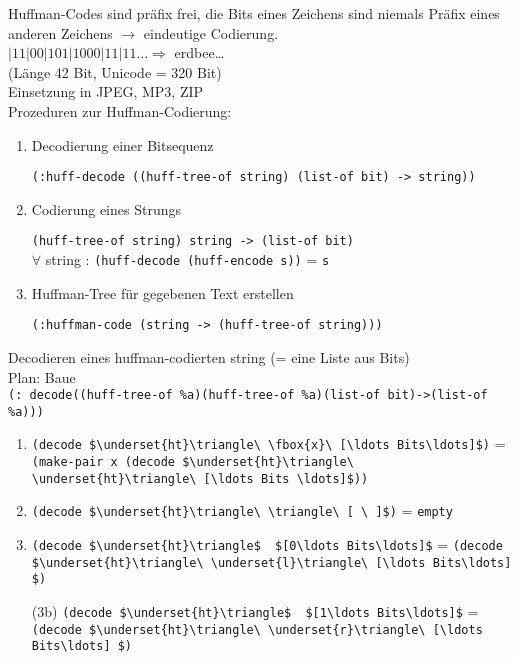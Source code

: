 Huffman-Codes sind präfix frei, die Bits eines Zeichens sind niemals Präfix eines anderen Zeichens $\rightarrow$ eindeutige Codierung.\\
$\vert11\vert00\vert101\vert1000\vert11\vert11\ldots \Rightarrow$ erdbee\ldots\\
(Länge 42 Bit, Unicode = 320 Bit)\\
Einsetzung in JPEG, MP3, ZIP\\
Prozeduren zur Huffman-Codierung:
\begin{enumerate}[(1)]
\item Decodierung einer Bitsequenz \par\lstinline|(:huff-decode ((huff-tree-of string) (list-of bit) -> string))|
\item Codierung eines Strungs\par\lstinline|(huff-tree-of string) string -> (list-of bit)|\\
$\forall$ string : \lstinline|(huff-decode (huff-encode s))| = \lstinline|s|
\item Huffman-Tree für gegebenen Text erstellen\par\lstinline|(:huffman-code (string -> (huff-tree-of string)))|
\end{enumerate}
Decodieren eines huffman-codierten string (= eine Liste aus Bits)\\
Plan: Baue \\\lstinline|(: decode((huff-tree-of %a)(huff-tree-of %a)(list-of bit)->(list-of %a)))|
\begin{enumerate}[(1)]
\item \lstinline[mathescape]|(decode $\underset{ht}\triangle\ \fbox{x}\ [\ldots Bits\ldots]$)| = \lstinline[mathescape]|(make-pair x (decode $\underset{ht}\triangle\ \underset{ht}\triangle\ [\ldots Bits \ldots]$))|
\item \lstinline[mathescape]|(decode $\underset{ht}\triangle\ \triangle\ [ \ ]$)| = \lstinline[mathescape]|empty|
\item[(3a)] \lstinline[mathescape]|(decode $\underset{ht}\triangle$ |\ \lstinline[mathescape]|$[0\ldots Bits\ldots]$| = \lstinline[mathescape]|(decode $\underset{ht}\triangle\ \underset{l}\triangle\ [\ldots Bits\ldots] $)|
\item[(3b)] \lstinline[mathescape]|(decode $\underset{ht}\triangle$ |\ \lstinline[mathescape]|$[1\ldots Bits\ldots]$| = \lstinline[mathescape]|(decode $\underset{ht}\triangle\ \underset{r}\triangle\ [\ldots Bits\ldots] $)|
\end{enumerate}
